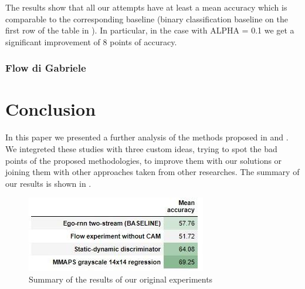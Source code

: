 \documentclass[10pt,twocolumn,hidelinks,letterpaper]{article}
\begin{document}
The results show that all our attempts have at least a mean accuracy which is comparable to the corresponding baseline (binary classification baseline on the first row of the table in ). In particular, in the case with ALPHA = 0.1 we get a significant improvement of 8 points of accuracy.

\subsubsection{Flow di Gabriele} %

\section{Conclusion}

In this paper we presented a further analysis of the methods proposed in \cite{egornn} and \cite{sparnet}. We integreted these studies with three custom ideas, trying to spot the bad points of the proposed methodologies, to improve them with our solutions or joining them with other approaches taken from other researches. The summary of our results is shown in .

\begin{figure}[t]
  \centering
  \includegraphics[width=.8\linewidth]{images/summary_table.jpg}
  \caption{Summary of the results of our original experiments}
  \label{DS_table}
\end{figure}
\end{document}
